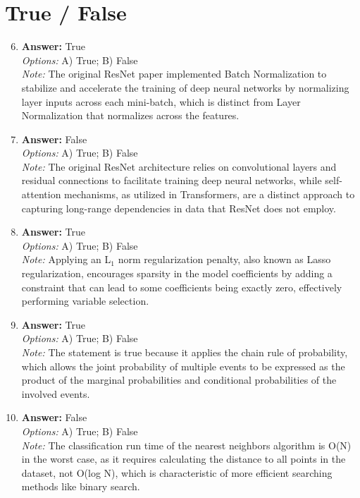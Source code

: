 \documentclass[12pt]{article}
\begin{document}
\section*{True / False}
\begin{enumerate}[label=\arabic*.]
\setcounter{enumi}{5}
\item \textbf{Answer:} True
\\ \textit{Options:} A) True; B) False
\\ \textit{Note:} The original ResNet paper implemented Batch Normalization to stabilize and accelerate the training of deep neural networks by normalizing layer inputs across each mini-batch, which is distinct from Layer Normalization that normalizes across the features.
\item \textbf{Answer:} False
\\ \textit{Options:} A) True; B) False
\\ \textit{Note:} The original ResNet architecture relies on convolutional layers and residual connections to facilitate training deep neural networks, while self-attention mechanisms, as utilized in Transformers, are a distinct approach to capturing long-range dependencies in data that ResNet does not employ.
\item \textbf{Answer:} True
\\ \textit{Options:} A) True; B) False
\\ \textit{Note:} Applying an L$_{1}$ norm regularization penalty, also known as Lasso regularization, encourages sparsity in the model coefficients by adding a constraint that can lead to some coefficients being exactly zero, effectively performing variable selection.
\item \textbf{Answer:} True
\\ \textit{Options:} A) True; B) False
\\ \textit{Note:} The statement is true because it applies the chain rule of probability, which allows the joint probability of multiple events to be expressed as the product of the marginal probabilities and conditional probabilities of the involved events.
\item \textbf{Answer:} False
\\ \textit{Options:} A) True; B) False
\\ \textit{Note:} The classification run time of the nearest neighbors algorithm is O(N) in the worst case, as it requires calculating the distance to all points in the dataset, not O(log N), which is characteristic of more efficient searching methods like binary search.
\end{enumerate}
\end{document}
